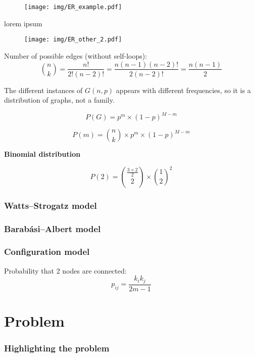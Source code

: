 \documentclass[table]{report}
\begin{document}
\begin{figure}[h]%
\centering
\texttt{[image: img/ER\_example.pdf]}
\caption{}
\label{fig:graphs}
\end{figure}

lorem ipsum 
\begin{figure}[h]%
\centering
\texttt{[image: img/ER\_other\_2.pdf]}
\caption{}
\label{fig:graphs}
\end{figure}
\FloatBarrier




Number of possible edges (without self-loops):
$$\binom{n}{k} = \dfrac{n!}{2!(n-2)!} = 
\dfrac{n(n-1)(n-2)!}{2(n-2)!} = \dfrac{n(n-1)}{2}$$

The different instances of $G(n,p)$ appears with different frequencies, so it is a distribution of graphs, not a family.

$$P(G)=p^{m}\times(1-p)^{M-m}$$

$$P(m)=\binom{n}{k}\times  p^{m}\times(1-p)^{M-m}$$

\textbf{Binomial distribution}

$$P(2) = \binom{\frac{3 \times 2}{2}}{2} \times \binom{1}{2}^{2}$$



\newpage
\subsection{Watts–Strogatz model}
\subsection{Barabási–Albert model}
\subsection{Configuration model}
Probability that 2 nodes are connected:
$$p_{ij} = \dfrac{k_{i}k_{j}}{2m-1}$$





\chapter{Problem}
\minitoc
\subsection{Highlighting the problem}

\end{document}
